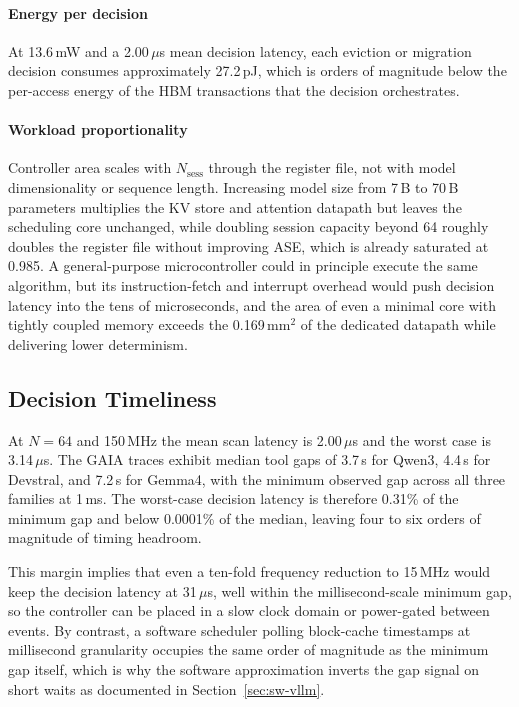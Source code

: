 \paragraph{Energy per decision}
At 13.6\,mW and a 2.00\,$\mu$s mean decision latency, each eviction
or migration decision consumes approximately 27.2\,pJ, which is orders
of magnitude below the per-access energy of the HBM transactions that
the decision orchestrates.

\paragraph{Workload proportionality}
Controller area scales with $N_{\mathrm{sess}}$ through the register
file, not with model dimensionality or sequence length. Increasing model
size from 7\,B to 70\,B parameters multiplies the KV store and
attention datapath but leaves the scheduling core unchanged, while
doubling session capacity beyond 64 roughly doubles the register file
without improving ASE, which is already saturated at 0.985. A
general-purpose microcontroller could in principle execute the same
algorithm, but its instruction-fetch and interrupt overhead would push
decision latency into the tens of microseconds, and the area of even a
minimal core with tightly coupled memory exceeds the 0.169\,mm$^{2}$
of the dedicated datapath while delivering lower determinism.

\subsection{Decision Timeliness}
\label{sec:hw-time}

At $N{=}64$ and 150\,MHz the mean scan latency is 2.00\,$\mu$s and
the worst case is 3.14\,$\mu$s. The GAIA traces exhibit median tool
gaps of 3.7\,s for Qwen3, 4.4\,s for Devstral, and 7.2\,s for
Gemma4, with the minimum observed gap across all three families at
1\,ms. The worst-case decision latency is therefore 0.31\% of the
minimum gap and below 0.0001\% of the median, leaving four to six
orders of magnitude of timing headroom.

This margin implies that even a ten-fold frequency reduction to
15\,MHz would keep the decision latency at 31\,$\mu$s, well within the
millisecond-scale minimum gap, so the controller can be placed in a
slow clock domain or power-gated between events. By contrast, a
software scheduler polling block-cache timestamps at millisecond
granularity occupies the same order of magnitude as the minimum gap
itself, which is why the software approximation inverts the gap signal
on short waits as documented in Section~\ref{sec:sw-vllm}.

